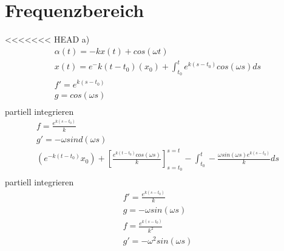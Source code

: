 \section{Frequenzbereich}\label{sec:ag3_2}
<<<<<<< HEAD
a)
\begin{gather*}
\alpha(t)=-kx(t)+cos(\omega t)\\
x(t)=e{^-k(t-t_0)}(x_0)+\int_{t_0}^{t} e^{k(s-t_0)}cos(\omega s)ds\\
f'=e^{k(s-t_0)}\\
g=cos(\omega s)\\
\end{gather*}
partiell integrieren
\begin{gather*}
f=\frac{e^{k(s-t_0)}}{k}\\
g'=-\omega sind(\omega s)\\
(e^{-k(t-t_0)}x_0)+[\frac{e^{k(t-t_0)}cos(\omega s)}{k}]^{s=t}_{s=t_0}-\int_{t_0}^{t}-\frac{\omega sin(\omega s)e^{k(s-t_0)}}{k}ds\\
\end{gather*}
partiell integrieren
\begin{gather*}
f'=\frac{e^{k(s-t_0)}}{k}\\
g=-\omega sin(\omega s)\\
f=\frac{e^{k(s-t_0)}}{k^2}\\
g'=-\omega^2 sin(\omega s)\\
\end{gather*}
